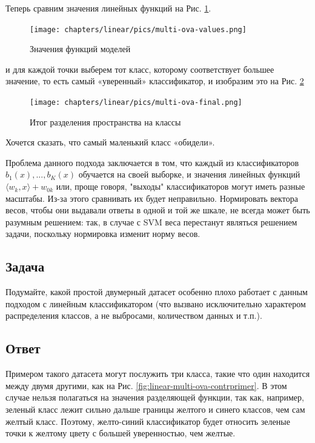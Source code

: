 \begin{itemize}
Теперь сравним значения линейных функций на Рис. \ref{fig:linear-multi-ova-values}.

\begin{figure}[H]
	\centering
	\texttt{[image: chapters/linear/pics/multi-ova-values.png]}
	\caption{Значения функций моделей}
	\label{fig:linear-multi-ova-values}
\end{figure}

и для каждой точки выберем тот класс, которому соответствует большее значение, то есть самый «уверенный» классификатор, и изобразим это на Рис. \ref{fig:linear-multi-ova-final}

\begin{figure}[H]
	\centering
	\texttt{[image: chapters/linear/pics/multi-ova-final.png]}
	\caption{Итог разделения пространства на классы}
	\label{fig:linear-multi-ova-final}
\end{figure}

Хочется сказать, что самый маленький класс «обидели».

Проблема данного подхода заключается в том, что каждый из классификаторов $b_1(x),...,b_K(x)$ обучается на своей выборке, и значения линейных функций $\langle w_k, x \rangle+w_{0k}$ или, проще говоря, "выходы" классификаторов могут иметь разные масштабы. Из-за этого сравнивать их будет неправильно. Нормировать вектора весов, чтобы они выдавали ответы в одной и той же шкале, не всегда может быть разумным решением: так, в случае с SVM веса перестанут являться решением задачи, поскольку нормировка изменит норму весов.

\subsection*{Задача}

Подумайте, какой простой двумерный датасет особенно плохо работает с данным подходом с линейным классификатором (что вызвано исключительно характером распределения классов, а не выбросами, количеством данных и т.п.).

\subsection*{Ответ}

Примером такого датасета могут послужить три класса, такие что один находится между двумя другими, как на Рис. \ref{fig:linear-multi-ova-contrprimer}. В этом случае нельзя полагаться на значения разделяющей функции, так как, например, зеленый класс лежит сильно дальше границы желтого и синего классов, чем сам желтый класс. Поэтому, желто-синий классификатор будет относить зеленые точки к желтому цвету с большей уверенностью, чем желтые.


\end{itemize}
